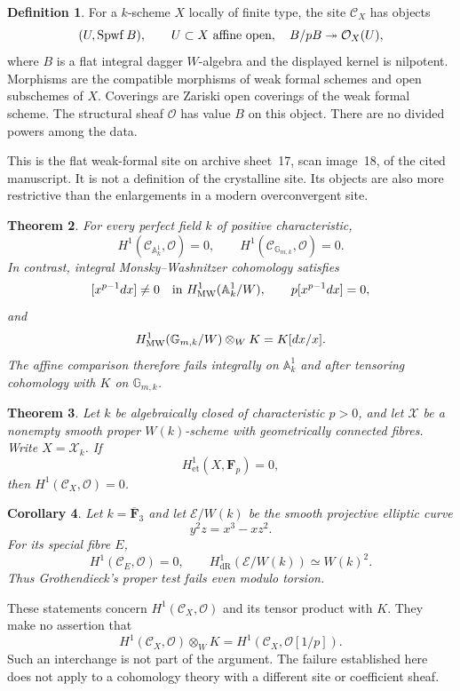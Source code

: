 \documentclass[11pt]{article}
\newcommand{\OO}{\mathcal O}\newcommand{\CC}{\mathcal C}
\newcommand{\A}{\mathbb A}\newcommand{\Gm}{\mathbb G_m}
\newcommand{\dR}{\mathrm{dR}}\newcommand{\et}{\mathrm{et}}
\newtheorem{theorem}{Theorem}[section]
\newtheorem{corollary}[theorem]{Corollary}
\theoremstyle{definition}\newtheorem{definition}[theorem]{Definition}
\theoremstyle{remark}\newtheorem{remark}[theorem]{Remark}
\begin{document}
\begin{definition}\label{def:site}
For a $k$-scheme $X$ locally of finite type, the site $\CC_X$ has objects
\[
 (U,\Spwf B),\qquad
 U\subset X\text{ affine open},\quad
 B/pB\twoheadrightarrow\OO_X(U),
\]
where $B$ is a flat integral dagger $W$-algebra and the displayed kernel is nilpotent. Morphisms are the compatible morphisms of weak formal schemes and open subschemes of $X$. Coverings are Zariski open coverings of the weak formal scheme. The structural sheaf $\OO$ has value $B$ on this object. There are no divided powers among the data.
\end{definition}

This is the flat weak-formal site on archive sheet~17, scan image~18, of the cited manuscript. It is not a definition of the crystalline site. Its objects are also more restrictive than the enlargements in a modern overconvergent site.

\begin{theorem}\label{thm:affine}
For every perfect field $k$ of positive characteristic,
\[
 H^1(\CC_{\A^1_k},\OO)=0,
 \qquad H^1(\CC_{\mathbb G_{m,k}},\OO)=0.
\]
In contrast, integral Monsky--Washnitzer cohomology satisfies
\[
 [x^{p-1}dx]\ne0\quad\text{in }H^1_{\rm MW}(\A^1_k/W),
 \qquad p[x^{p-1}dx]=0,
\]
and
\[
 H^1_{\rm MW}(\mathbb G_{m,k}/W)\otimes_WK=K[dx/x].
\]
The affine comparison therefore fails integrally on $\A^1_k$ and after tensoring cohomology with $K$ on $\mathbb G_{m,k}$.
\end{theorem}

\begin{theorem}\label{thm:proper}
Let $k$ be algebraically closed of characteristic $p>0$, and let $\mathcal X$ be a nonempty smooth proper $W(k)$-scheme with geometrically connected fibres. Write $X=\mathcal X_k$. If
\[
 H^1_{\et}(X,\mathbf F_p)=0,
\]
then $H^1(\CC_X,\OO)=0$.
\end{theorem}

\begin{corollary}\label{cor:elliptic}
Let $k=\overline{\mathbf F}_3$ and let $\mathcal E/W(k)$ be the smooth projective elliptic curve
\[
 y^2z=x^3-xz^2.
\]
For its special fibre $E$,
\[
 H^1(\CC_E,\OO)=0,
 \qquad H^1_{\dR}(\mathcal E/W(k))\simeq W(k)^2.
\]
Thus Grothendieck's proper test fails even modulo torsion.
\end{corollary}

These statements concern $H^1(\CC_X,\OO)$ and its tensor product with $K$. They make no assertion that
\[
 H^1(\CC_X,\OO)\otimes_WK
       =H^1(\CC_X,\OO[1/p]).
\]
Such an interchange is not part of the argument. The failure established here does not apply to a cohomology theory with a different site or coefficient sheaf.
\end{document}
